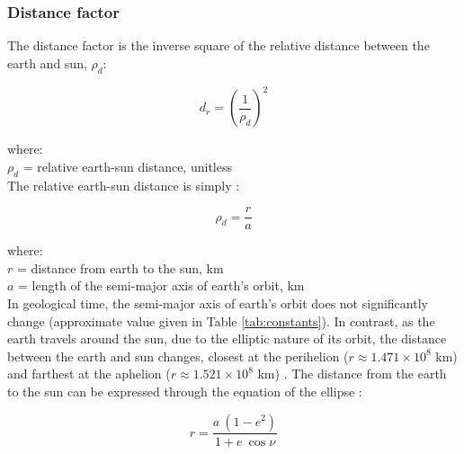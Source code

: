 \subsubsection{Distance factor}
\label{sec:dr}
The distance factor is the inverse square of the relative distance between the earth and sun, $\rho_{d}$:

\begin{equation}
\label{eq:dr}
    d_{r} = \left(\frac{1}{\rho_{d}}\right)^2
\end{equation}

\noindent where: \\
\indent $\rho_{d}$ = relative earth-sun distance, unitless \\

\noindent The relative earth-sun distance is simply \parencite{loutre03}:

\begin{equation}
\label{eq:rho}
    \rho_{d} = \frac{r}{a}
\end{equation}

\noindent where: \\
\indent $r$ = distance from earth to the sun, km \\
\indent $a$ = length of the semi-major axis of earth's orbit, km\\

\noindent In geological time, the semi-major axis of earth's orbit does not significantly change (approximate value given in Table \ref{tab:constants}). 
In contrast, as the earth travels around the sun, due to the elliptic nature of its orbit, the distance between the earth and sun changes, closest at the perihelion ($r \approx 1.471 \times 10^8$ km) and farthest at the aphelion ($r \approx 1.521 \times 10^8$ km) \parencite{allen73}. 
The distance from the earth to the sun can be expressed through the equation of the ellipse \parencite{loutre03}:

%
\begin{equation}
\label{eq:r}
    r = \frac{a \: \left(1 - e^2\right)}{1+e \: \cos \nu}
\end{equation}

